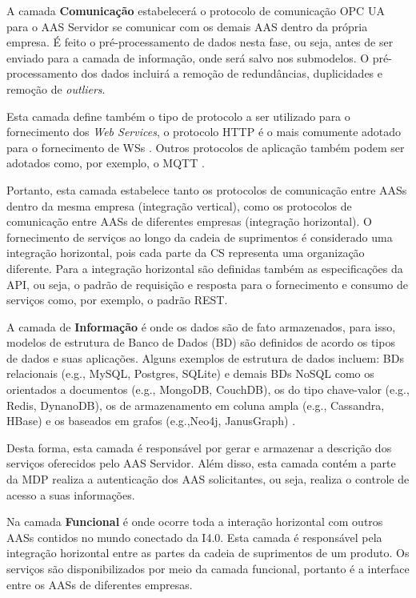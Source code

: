 	A camada \textbf{Comunicação} estabelecerá o protocolo de comunicação OPC UA para o AAS Servidor se comunicar com os demais AAS dentro da própria empresa. É feito o pré-processamento de dados nesta fase, ou seja, antes de ser enviado para a camada de informação, onde será salvo nos submodelos. O pré-processamento dos dados incluirá a remoção de redundâncias, duplicidades e remoção de \textit{outliers}.
	
	Esta camada define também o tipo de protocolo a ser utilizado para o fornecimento dos \textit{Web Services}, o protocolo HTTP é o mais comumente adotado para o fornecimento de WSs \cite{gruner2016restful}. Outros protocolos de aplicação também podem ser adotados como, por exemplo, o MQTT \cite{yokotani2016mqtt}.
	
	Portanto, esta camada estabelece tanto os protocolos de comunicação entre AASs dentro da mesma empresa (integração vertical), como os protocolos de comunicação entre AASs de diferentes empresas (integração horizontal). O fornecimento de serviços ao longo da cadeia de suprimentos é considerado uma integração horizontal, pois cada parte da CS representa uma organização diferente. Para a integração horizontal são definidas também as especificações da API, ou seja, o padrão de requisição e resposta para o fornecimento e consumo de serviços como, por exemplo, o padrão REST.
	
	A camada de \textbf{Informação} é onde os dados são de fato armazenados, para isso, modelos de estrutura de Banco de Dados (BD) são definidos de acordo os tipos de dados e suas aplicações. Alguns exemplos de estrutura de dados incluem: BDs relacionais (e.g., MySQL, Postgres, SQLite) \cite{morris2017relationaldatabase} e demais BDs NoSQL como os orientados a documentos (e.g., MongoDB, CouchDB), os do tipo chave-valor (e.g., Redis, DynanoDB), os de armazenamento em coluna ampla (e.g., Cassandra, HBase) e os baseados em grafos (e.g.,Neo4j, JanusGraph) \cite{schaefer2019nosql}.
	
	Desta forma, esta camada é responsável por gerar e armazenar a descrição dos serviços oferecidos pelo AAS Servidor. Além disso, esta camada contém a parte da MDP realiza a autenticação dos AAS solicitantes, ou seja, realiza o controle de acesso a suas informações.
	
	Na camada \textbf{Funcional} é onde ocorre toda a interação horizontal com outros AASs contidos no mundo conectado da I4.0. Esta camada é responsável pela integração horizontal entre as partes da cadeia de suprimentos de um produto. Os serviços são disponibilizados por meio da camada funcional, portanto é a interface entre os AASs de diferentes empresas.
	
